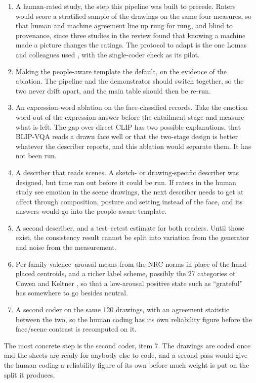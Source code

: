 \begin{enumerate}
\item A human-rated study, the step this pipeline was built to precede. Raters would score a stratified sample of the drawings on the same four measures, so that human and machine agreement line up rung for rung, and blind to provenance, since three studies in the review \cite{ragot2020ai, horton2023bias, millet2023defending} found that knowing a machine made a picture changes the ratings. The protocol to adapt is the one Lomas and colleagues used \cite{lomas2024improved}, with the single-coder check as its pilot.
\item Making the people-aware template the default, on the evidence of the ablation. The pipeline and the demonstrator should switch together, so the two never drift apart, and the main table should then be re-run.
\item An expression-word ablation on the face-classified records. Take the emotion word out of the expression answer before the entailment stage and measure what is left. The gap over direct CLIP has two possible explanations, that BLIP-VQA reads a drawn face well or that the two-stage design is better whatever the describer reports, and this ablation would separate them. It has not been run.
\item A describer that reads scenes. A sketch- or drawing-specific describer was designed, but time ran out before it could be run. If raters in the human study see emotion in the scene drawings, the next describer needs to get at affect through composition, posture and setting instead of the face, and its answers would go into the people-aware template.
\item A second describer, and a test--retest estimate for both readers. Until those exist, the consistency result cannot be split into variation from the generator and noise from the measurement.
\item Per-family valence--arousal means from the NRC norms \cite{mohammad2018obtaining} in place of the hand-placed centroids, and a richer label scheme, possibly the 27 categories of Cowen and Keltner \cite{cowen2017self}, so that a low-arousal positive state such as ``grateful'' has somewhere to go besides neutral.
\item A second coder on the same 120 drawings, with an agreement statistic between the two, so the human coding has its own reliability figure before the face/scene contrast is recomputed on it.
\end{enumerate}

The most concrete step is the second coder, item 7. The \HcN{} drawings are coded once and the sheets are ready for anybody else to code, and a second pass would give the human coding a reliability figure of its own before much weight is put on the split it produces.
